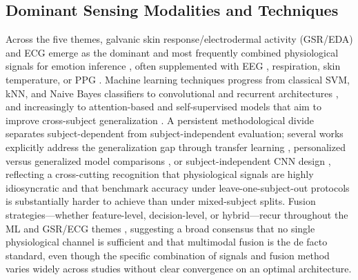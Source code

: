 \subsection{Dominant Sensing Modalities and Techniques}
Across the five themes, galvanic skin response/electrodermal activity (GSR/EDA) and ECG emerge as the dominant and most frequently combined physiological signals for emotion inference \cite{ayata2017emotion,fan2023human,machot2019deep,bulagang2020review,damelio2025emotion,sumanth2025bilstm,dessai2024multimodal}, often supplemented with EEG \cite{houssein2022human,kwon2018electroencephalography,dar2020cnn,cimtay2020cross}, respiration, skin temperature, or PPG \cite{liu2018human,wei2018emotion,ayata2020emotion,bamonte2024determining,darabkh2026exploring}. Machine learning techniques progress from classical SVM, kNN, and Naive Bayes classifiers \cite{setyohadi2018galvanic,marinmorales2018affective,shahid2026comparative} to convolutional and recurrent architectures \cite{granados2018deep,dar2020cnn,nandini2025ensemble,liao2025emotion}, and increasingly to attention-based and self-supervised models that aim to improve cross-subject generalization \cite{zou2024emotion,dissanayake2022sigrep,wu2023transformer,li2025transformer}. A persistent methodological divide separates subject-dependent from subject-independent evaluation; several works explicitly address the generalization gap through transfer learning \cite{jacobsen2021classification}, personalized versus generalized model comparisons \cite{li2024comparison}, or subject-independent CNN design \cite{machot2019deep}, reflecting a cross-cutting recognition that physiological signals are highly idiosyncratic and that benchmark accuracy under leave-one-subject-out protocols is substantially harder to achieve than under mixed-subject splits. Fusion strategies---whether feature-level, decision-level, or hybrid---recur throughout the ML and GSR/ECG themes \cite{wei2018emotion,cimtay2020cross,dessai2024multimodal,subasi2025multimodal,zou2024emotion}, suggesting a broad consensus that no single physiological channel is sufficient and that multimodal fusion is the de facto standard, even though the specific combination of signals and fusion method varies widely across studies without clear convergence on an optimal architecture.

